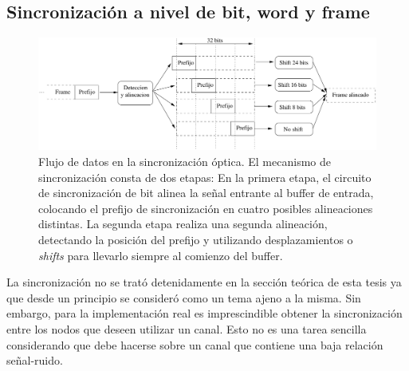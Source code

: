 \subsection{Sincronización a nivel de bit, word y frame}
\label{fpga:sync}
\begin{figure}[t]
  \centering
    \includegraphics[width=6in]{graphs/optsync.pdf}
\caption {Flujo de datos en la sincronización óptica. El mecanismo de sincronización consta de dos etapas: En la primera etapa, el circuito de sincronización de bit alinea la señal entrante al buffer de entrada, colocando el prefijo de sincronización en cuatro posibles alineaciones distintas. La segunda etapa realiza una segunda alineación, detectando la posición del prefijo y utilizando desplazamientos o \textit{shifts} para llevarlo siempre al comienzo del buffer.}
\label{fig:optsync}
\end{figure}


La sincronización no se trató detenidamente en la sección teórica de esta tesis ya que desde un principio se consideró como un tema ajeno a la misma. Sin embargo, para la implementación real es imprescindible obtener la sincronización entre los nodos que deseen utilizar un canal. Esto no es una tarea sencilla considerando que debe hacerse sobre un canal que contiene una baja relación señal-ruido.

